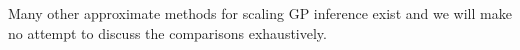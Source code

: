 \documentclass[manuscript, letterpaper]{aastex6}
\begin{document}
Many other approximate methods for scaling GP inference exist \citep[see, for
example,][and references therein]{Wilson:2015a} and we will make no attempt to
discuss the comparisons exhaustively.





\end{document}
